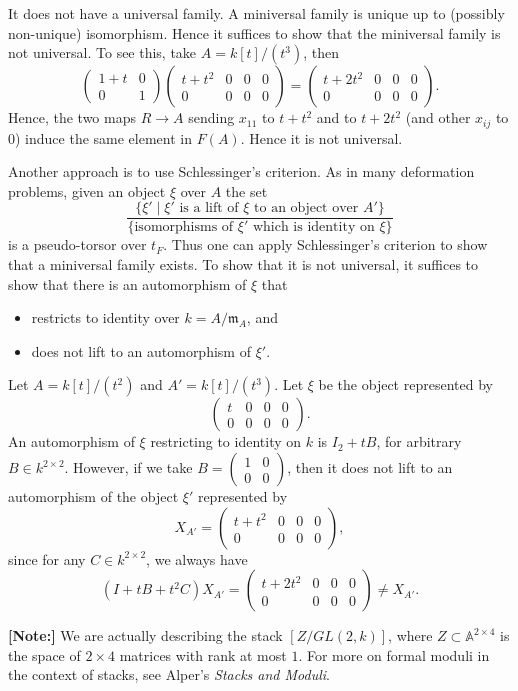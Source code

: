 \begin{enumerate}[label=\arabic*.]
It does not have a universal family. A miniversal family is unique up to (possibly non-unique) isomorphism.
Hence it suffices to show that the miniversal family is not universal. To see this, take $A=k[t]/(t^3)$, then
\[
\begin{pmatrix}
1+t & 0\\
0 & 1
\end{pmatrix}
\begin{pmatrix}
t+t^2 & 0 & 0 & 0\\
0 & 0 & 0 & 0
\end{pmatrix}
=
\begin{pmatrix}
t+2t^2 & 0 & 0 & 0\\
0 & 0 & 0 & 0
\end{pmatrix}.
\]
Hence, the two maps $R\to A$ sending $x_{11}$ to $t+t^2$ and to $t+2t^2$ (and other $x_{ij}$ to $0$) induce the same element in $F(A)$.
Hence it is not universal.

Another approach is to use Schlessinger's criterion. As in many deformation problems, given an object $\xi$ over $A$ the set
\[
\frac{\{\xi'\mid \xi'\text{ is a lift of }\xi\text{ to an object over }A'\}}
{\{\text{isomorphisms of }\xi'\text{ which is identity on }\xi\}}
\]
is a pseudo-torsor over $t_F$. Thus one can apply Schlessinger's criterion to show that a miniversal family exists.
To show that it is not universal, it suffices to show that there is an automorphism of $\xi$ that
\begin{itemize}
\item restricts to identity over $k=A/\mathfrak{m}_A$, and
\item does not lift to an automorphism of $\xi'$.
\end{itemize}
Let $A=k[t]/(t^2)$ and $A'=k[t]/(t^3)$. Let $\xi$ be the object represented by
\[
\begin{pmatrix}
t & 0 & 0 & 0\\
0 & 0 & 0 & 0
\end{pmatrix}.
\]
An automorphism of $\xi$ restricting to identity on $k$ is $I_2+tB$, for arbitrary $B\in k^{2\times 2}$.
However, if we take $B=\begin{pmatrix}1&0\\0&0\end{pmatrix}$, then it does not lift to an automorphism of the object $\xi'$
represented by
\[
X_{A'}=
\begin{pmatrix}
t+t^2 & 0 & 0 & 0\\
0 & 0 & 0 & 0
\end{pmatrix},
\]
since for any $C\in k^{2\times 2}$, we always have
\[
(I+tB+t^2C)X_{A'}=
\begin{pmatrix}
t+2t^2 & 0 & 0 & 0\\
0 & 0 & 0 & 0
\end{pmatrix}
\ne X_{A'}.
\]

\medskip
\textbf{[Note:]} We are actually describing the stack $[Z/GL(2,k)]$, where
$Z\subset \mathbb{A}^{2\times 4}$ is the space of $2\times 4$ matrices with rank at most $1$.
For more on formal moduli in the context of stacks, see Alper's \emph{Stacks and Moduli}.
\end{enumerate}